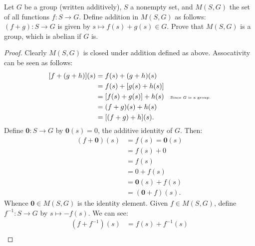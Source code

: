     \begin{exercise}
        Let $G$ be a group (written additively), $S$ a nonempty set, and $M(S,G)$ the set of all functions $f:S \rightarrow G$. Define addition in $M(S,G)$ as follows: $(f+g):S \rightarrow G$ is given by $s \mapsto f(s) + g(s) \in G$. Prove that $M(S,G)$ is a group, which is abelian if $G$ is.
    \end{exercise}
        {\color{blue} \begin{proof}
            Clearly $M(S,G)$ is closed under addition defined as above. Assocativity can be seen as follows:
                \begin{equation*}
                \begin{split}
                    [f+(g+h)](s)
                    & = f(s) + (g+h)(s) \\
                    & = f(s) + [g(s) + h(s)] \\
                    & = [f(s) + g(s)] + h(s) \h9\text{\tiny Since $G$ is a group.}\\
                    & = (f+g)(s) + h(s) \\
                    & = [(f+g)+h](s).
                \end{split}
                \end{equation*}
            Define $\mathbf{0}:S \rightarrow G$ by $\mathbf{0}(s) = 0$, the additive identity of $G$. Then:
                \begin{equation*}
                \begin{split}
                    (f+\mathbf{0})(s) 
                    & = f(s) = \mathbf{0}(s) \\
                    & = f(s) + 0 \\
                    & = f(s) \\
                    & = 0 + f(s) \\
                    & = \mathbf{0}(s) + f(s) \\
                    & = (\mathbf{0} + f)(s).
                \end{split}
                \end{equation*}
            Whence $\mathbf{0} \in M(S,G)$ is the identity element. Given $f \in M(S,G)$, define $f^{-1}:S \rightarrow G$ by $s \mapsto -f(s)$. We can see:
                \begin{equation*}
                \begin{split}
                    (f+f^{-1})(s) 
                    & = f(s) + f^{-1}(s) \\

\end{split}
\end{equation*}
\end{proof}}
